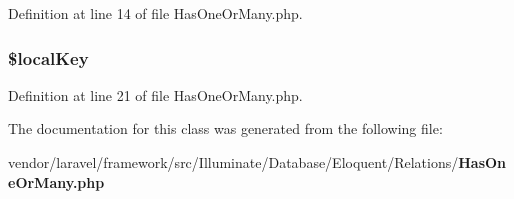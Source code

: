 Definition at line 14 of file Has\+One\+Or\+Many.\+php.

\subsubsection[{\$local\+Key}]{\setlength{\rightskip}{0pt plus 5cm}\$local\+Key\hspace{0.3cm}{\ttfamily [protected]}}\label{class_illuminate_1_1_database_1_1_eloquent_1_1_relations_1_1_has_one_or_many_aeb9b1804cec97bbae71de28b5b0cfe17}


Definition at line 21 of file Has\+One\+Or\+Many.\+php.



The documentation for this class was generated from the following file\+:\begin{DoxyCompactItemize}
\item 
vendor/laravel/framework/src/\+Illuminate/\+Database/\+Eloquent/\+Relations/{\bf Has\+One\+Or\+Many.\+php}\end{DoxyCompactItemize}
